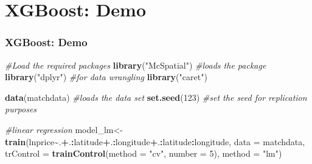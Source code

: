 \documentclass[
  shownotes,
  xcolor={svgnames},
  hyperref={colorlinks,citecolor=DarkBlue,linkcolor=DarkRed,urlcolor=DarkBlue}
  , aspectratio=169]{beamer}
\newenvironment{Shaded}{\begin{snugshade}}{\end{snugshade}}
\newcommand{\CommentTok}[1]{\textcolor[rgb]{0.56,0.35,0.01}{\textit{#1}}}
\newcommand{\DataTypeTok}[1]{\textcolor[rgb]{0.13,0.29,0.53}{#1}}
\newcommand{\DecValTok}[1]{\textcolor[rgb]{0.00,0.00,0.81}{#1}}
\newcommand{\KeywordTok}[1]{\textcolor[rgb]{0.13,0.29,0.53}{\textbf{#1}}}
\newcommand{\NormalTok}[1]{#1}
\newcommand{\OperatorTok}[1]{\textcolor[rgb]{0.81,0.36,0.00}{\textbf{#1}}}
\newcommand{\StringTok}[1]{\textcolor[rgb]{0.31,0.60,0.02}{#1}}
\begin{document}
\section{XGBoost: Demo}
\begin{frame}[fragile]
\frametitle{XGBoost: Demo}



\begin{Shaded}
\begin{Highlighting}[]
\CommentTok{\#Load the required packages}
\KeywordTok{library}\NormalTok{(}\StringTok{"McSpatial"}\NormalTok{) }\CommentTok{\#loads the package}
\KeywordTok{library}\NormalTok{(}\StringTok{"dplyr"}\NormalTok{) }\CommentTok{\#for data wrangling}
\KeywordTok{library}\NormalTok{(}\StringTok{"caret"}\NormalTok{)}

\KeywordTok{data}\NormalTok{(matchdata) }\CommentTok{\#loads the data set}
\KeywordTok{set.seed}\NormalTok{(}\DecValTok{123}\NormalTok{) }\CommentTok{\#set the seed for replication purposes}
\end{Highlighting}
\end{Shaded}

\begin{Shaded}
\begin{Highlighting}[]
\CommentTok{\#linear regression}
\NormalTok{model\_lm\textless{}{-}}\KeywordTok{train}\NormalTok{(lnprice}\OperatorTok{\textasciitilde{}}\NormalTok{.}\OperatorTok{+}\NormalTok{.}\OperatorTok{:}\NormalTok{latitude}\OperatorTok{+}\NormalTok{.}\OperatorTok{:}\NormalTok{longitude}\OperatorTok{+}\NormalTok{.}\OperatorTok{:}\NormalTok{latitude}\OperatorTok{:}\NormalTok{longitude,  }
                     \DataTypeTok{data =}\NormalTok{ matchdata,}
                     \DataTypeTok{trControl =} \KeywordTok{trainControl}\NormalTok{(}\DataTypeTok{method =} \StringTok{"cv"}\NormalTok{, }\DataTypeTok{number =} \DecValTok{5}\NormalTok{), }
                     \DataTypeTok{method =} \StringTok{"lm"}\NormalTok{)    }
\end{Highlighting}
\end{Shaded}

\end{frame}
\end{document}
